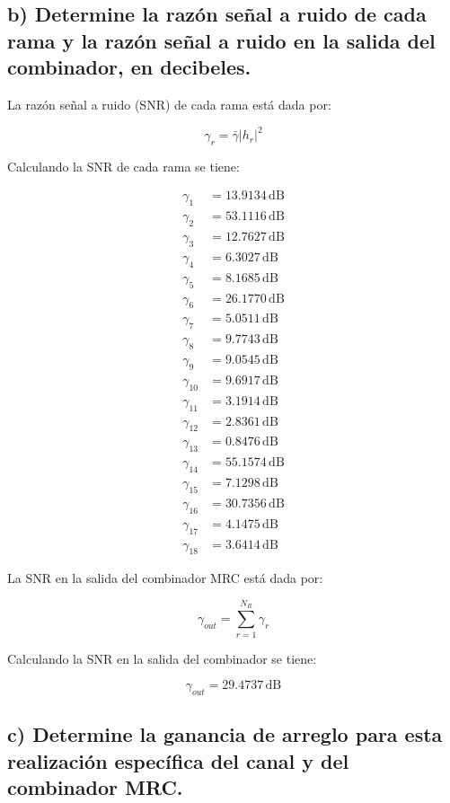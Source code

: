 \documentclass[11pt]{article}
\begin{document}
\subsection*{b) Determine la razón señal a ruido de cada rama y la razón señal a ruido en la salida del combinador, en decibeles.}

La razón señal a ruido (SNR) de cada rama está dada por:

\[
\gamma_r = \bar{\gamma} |h_r|^2
\]

Calculando la SNR de cada rama se tiene:

\begin{align*}
    \gamma_1 &= 13.9134 \, \text{dB} \\
    \gamma_2 &= 53.1116 \, \text{dB} \\
    \gamma_3 &= 12.7627 \, \text{dB} \\
    \gamma_4 &= 6.3027 \, \text{dB} \\
    \gamma_5 &= 8.1685 \, \text{dB} \\
    \gamma_6 &= 26.1770 \, \text{dB} \\
    \gamma_7 &= 5.0511 \, \text{dB} \\
    \gamma_8 &= 9.7743 \, \text{dB} \\
    \gamma_9 &= 9.0545 \, \text{dB} \\
    \gamma_{10} &= 9.6917 \, \text{dB} \\
    \gamma_{11} &= 3.1914 \, \text{dB} \\
    \gamma_{12} &= 2.8361 \, \text{dB} \\
    \gamma_{13} &= 0.8476  \, \text{dB} \\
    \gamma_{14} &= 55.1574 \, \text{dB} \\
    \gamma_{15} &= 7.1298 \, \text{dB} \\
    \gamma_{16} &= 30.7356 \, \text{dB} \\ 
    \gamma_{17} &= 4.1475 \, \text{dB} \\ 
    \gamma_{18} &= 3.6414 \, \text{dB}
\end{align*}

La SNR en la salida del combinador MRC está dada por:

\[
\gamma_{out} = \sum_{r=1}^{N_R} \gamma_r
\]

Calculando la SNR en la salida del combinador se tiene:

\[
\gamma_{out} = 29.4737 \, \text{dB}
\]

\subsection*{c) Determine la ganancia de arreglo para esta realización específica del canal y del combinador MRC.}
\end{document}
